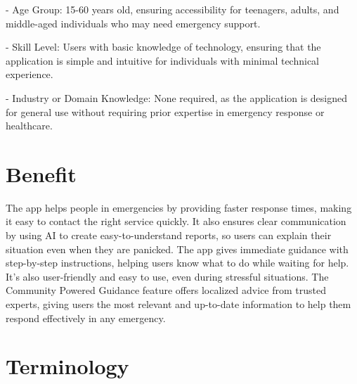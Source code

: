 - Age Group: 15-60 years old, ensuring accessibility for teenagers, adults, and middle-aged individuals who may need emergency support.

- Skill Level: Users with basic knowledge of technology, ensuring that the application is simple and intuitive for individuals with minimal technical experience.

- Industry or Domain Knowledge: None required, as the application is designed for general use without requiring prior expertise in emergency response or healthcare.


\section{Benefit}
\label{section:benefit}
The app helps people in emergencies by providing faster response times, making it easy to contact the right service quickly. It also ensures clear communication by using AI to create easy-to-understand reports, so users can explain their situation even when they are panicked. The app gives immediate guidance with step-by-step instructions, helping users know what to do while waiting for help. It’s also user-friendly and easy to use, even during stressful situations. The Community Powered Guidance feature offers localized advice from trusted experts, giving users the most relevant and up-to-date information to help them respond effectively in any emergency.


\section{Terminology}
\label{section:terminology}

